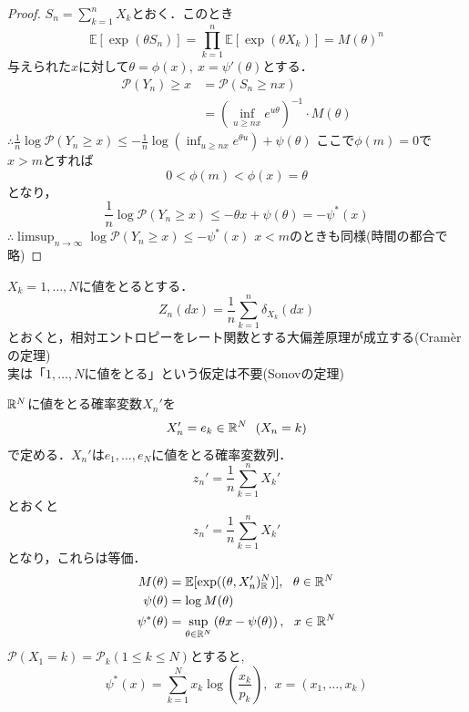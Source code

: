 \begin{proof}
    $S_n= \sum_{k= 1}^n X_k$とおく．このとき
\begin{equation}
    \mathbb{E}[\exp(\theta S_n)]= \prod_{k= 1}^n \mathbb{E}[\exp(\theta X_k)]= M(\theta)^n
\end{equation}
    与えられた$x$に対して$\theta= \phi(x),\ x= \psi'(\theta)$とする．
\begin{align}
    \mathcal{P}(Y_n)\ge x
    &= \mathcal{P}(S_n\ge nx)\\
    &= \left(\inf_{u\ge nx} e^{u\theta}\right)^{-1}\cdot M(\theta)
\end{align}
    $\therefore \frac{1}{n}\log{\mathcal{P}(Y_n\ge x)}\le -\frac{1}{n}\log{\left(\inf_{u\ge nx} e^{\theta u}\right)}+ \psi(\theta)$
    ここで$\phi(m)= 0$で$x> m$とすれば
\begin{equation}
    0< \phi(m)< \phi(x)= \theta
\end{equation}
    となり，
\begin{equation}
    \frac{1}{n}\log{\mathcal{P}(Y_n\ge x)}\le -\theta x+ \psi(\theta)= -\psi^*(x)
\end{equation}
    $\therefore \limsup_{n\to \infty} \log{\mathcal{P}(Y_n\ge x)}\le -\psi^*(x)$
    $x< m$のときも同様(時間の都合で略)
\end{proof}
    $X_k= 1, \ldots, N$に値をとるとする．
\begin{equation}
    Z_n(dx)= \frac{1}{n}\sum_{k= 1}^n \delta_{X_k}(dx)
\end{equation}
    とおくと，相対エントロピーをレート関数とする大偏差原理が成立する(Cram\`erの定理)\\
    実は「$1, \ldots, N$に値をとる」という仮定は不要(Sonovの定理)

    $\mathbb{R}^N$に値をとる確率変数$X_n'$を
\begin{equation}
    X_n'= e_k\in \mathbb{R}^N\ \ (X_n= k)
\end{equation}
    で定める．$X_n'$は$e_1, \ldots, e_N$に値をとる確率変数列．
\begin{equation}
    z_n'= \frac{1}{n}\sum_{k= 1}^n X_k'
\end{equation}
    とおくと
\begin{equation}
    z_n'= \frac{1}{n}\sum_{k= 1}^n X_k'
\end{equation}
    となり，これらは等価．
\begin{align}
    M(\theta)&= \mathbb{E}[\exp((\theta, X_n')_{\mathbb{R}}^N)],\ \ \theta\in \mathbb{R}^N\\
    \psi(\theta)&= \log{M(\theta)}\\
    \psi^*(\theta)&= \sup_{\theta\in \mathbb{R}^N} \left(\theta x- \psi(\theta)\right),\ \ x\in \mathbb{R}^N
\end{align}
    $\mathcal{P}(X_1= k)= \mathcal{P}_k(1\le k\le N)$とすると,
\begin{equation}
    \psi^*(x)= \sum_{k= 1}^N x_k\log{\left(\frac{x_k}{p_k}\right)},\ \ x= (x_1, \ldots, x_k)
\end{equation}